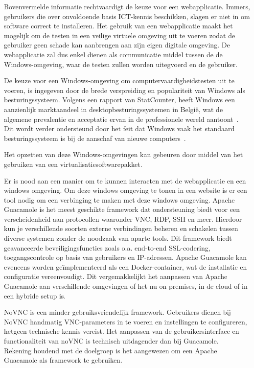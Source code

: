 Bovenvermelde informatie rechtvaardigt de keuze voor een webapplicatie. Immers, gebruikers die over onvoldoende basis ICT-kennis beschikken, slagen er niet in om software correct te installeren. Het gebruik van een webapplicatie maakt het mogelijk om de testen in een veilige virtuele omgeving uit te voeren zodat de gebruiker geen schade kan aanbrengen aan zijn eigen digitale omgeving. De webapplicatie zal dus enkel dienen als communicatie middel tussen de de Windows-omgeving, waar de testen zullen worden uitegvoerd en de gebruiker.

De keuze voor een Windows-omgeving om computervaardigheidstesten uit te voeren, is ingegeven door de brede verspreiding en populariteit van Windows als besturingssysteem. Volgens een rapport van StatCounter, heeft Windows een aanzienlijk marktaandeel in desktopbesturingssystemen in België, wat de algemene prevalentie en acceptatie ervan in de professionele wereld aantoont~\autocite{StatCounterOSMarketShare}. Dit wordt verder ondersteund door het feit dat Windows vaak het standaard besturingssysteem is bij de aanschaf van nieuwe computers~\autocite{ProfolusWindowsPopularity}.

Het opzetten van deze Windows-omgevingen kan gebeuren door middel van het gebruiken van een virtualisatiesoftwarepakket.

Er is nood aan een manier om te kunnen interacten met de webapplicatie en een windows omgeving. Om deze windows omgeving te tonen in een website is er een tool nodig om een verbinging te maken met deze windows omgeving. Apache Guacamole is het meest geschikte framework dat ondersteuning biedt voor een verscheidenheid aan protocollen waaronder VNC, RDP, SSH en meer. Hierdoor kun je verschillende soorten externe verbindingen beheren en schakelen tussen diverse systemen zonder de noodzaak van aparte tools. Dit framework biedt geavanceerde beveiligingsfuncties zoals o.a. end-to-end SSL-codering, toegangscontrole op basis van gebruikers en IP-adressen. Apache Guacamole kan eveneens worden geïmplementeerd als een Docker-container, wat de installatie en configuratie vereenvoudigt. Dit vergemakkelijkt het aanpassen van Apache Guacamole aan verschillende omgevingen of het nu on-premises, in de cloud of in een hybride setup is. ~\autocite{ApacheGuacamole} %

NoVNC is een minder gebruiksvriendelijk framework. Gebruikers dienen bij NoVNC handmatig VNC-parameters in te voeren en instellingen te configureren, hetgeen technische kennis vereist. Het aanpassen van de gebruikersinterface en functionaliteit van noVNC is technisch uitdagender dan bij Guacamole. ~\autocite{noVNC} %
Rekening houdend met de doelgroep is het aangewezen om een Apache Guacamole als framework te gebruiken.

